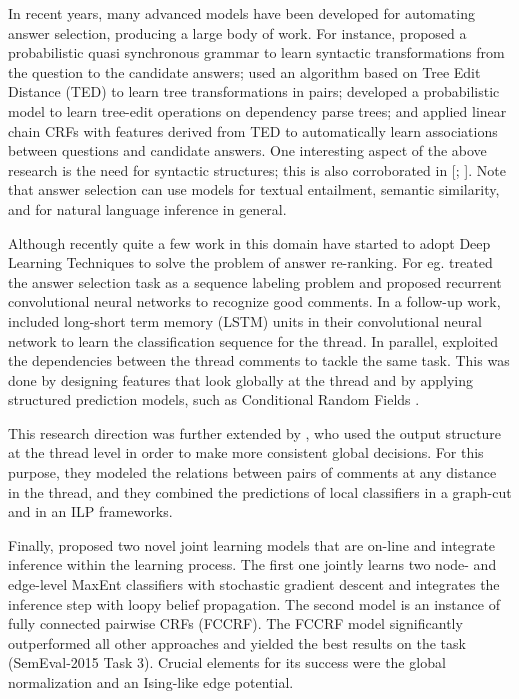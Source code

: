 \documentclass[12pt, a4paper, oneside]{Thesis} %
\begin{document}
In recent years, many advanced models have been developed for automating answer selection, producing a large body of work. For instance, \cite{wang2007jeopardy} proposed a probabilistic quasi synchronous grammar to learn syntactic transformations from the question to the candidate answers; \cite{heilman2010tree} used an algorithm based on Tree Edit Distance (TED) to learn tree transformations in pairs; \cite{wang2010probabilistic} developed a probabilistic model to learn tree-edit operations on dependency parse trees; and \cite{yao2013answer} applied linear chain CRFs with features derived from TED to automatically learn associations between questions and candidate answers. One interesting aspect of the above research is the need for syntactic structures; this is also corroborated in [\cite{severyn2012structural}; \cite{severyn2013automatic}]. Note that answer selection can use models for textual entailment, semantic similarity, and for natural language inference in general.

Although recently quite a few work in this domain have started to adopt Deep Learning Techniques to solve the problem of answer re-ranking. For eg. \cite{lin2015icrc} treated the answer selection task as a sequence labeling problem and proposed recurrent convolutional neural networks to recognize good comments. In a follow-up work, \cite{zhou2015answer} included long-short term memory (LSTM) units in their convolutional neural network to learn the classification sequence for the thread. In parallel, \cite{barron2015thread} exploited the dependencies between the thread comments to tackle the same task. This was done by designing features that look globally at the thread and by applying structured prediction models, such as Conditional Random Fields \cite{lafferty2001conditional}.

This research direction was further extended by \cite{joty2015global}, who used the output structure at the thread level in order to make more consistent global decisions. For this purpose, they modeled the relations between pairs of comments at any distance in the thread, and they combined the predictions of local classifiers in a graph-cut and in an ILP frameworks.

Finally, \cite{shafiq2016joint} proposed two novel joint learning models that are on-line and integrate inference within the learning process. The first one jointly learns two node- and edge-level MaxEnt classifiers with stochastic gradient descent and integrates the inference step with loopy belief propagation. The second model is an instance of fully connected pairwise CRFs (FCCRF). The FCCRF model significantly outperformed all other approaches and yielded the best results on the task (SemEval-2015 Task 3). Crucial elements for its success were the global normalization and an Ising-like edge potential.
\end{document}
